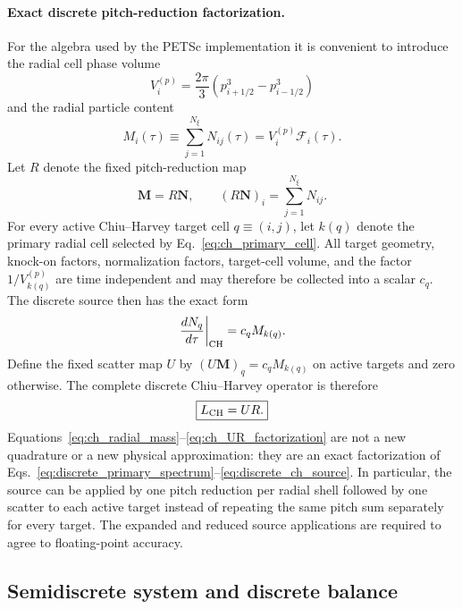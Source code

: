 \documentclass[11pt]{article}
\begin{document}
\paragraph{Exact discrete pitch-reduction factorization.}
For the algebra used by the PETSc implementation it is convenient to introduce the radial
cell phase volume
\begin{equation}
 V_i^{(p)}=\frac{2\pi}{3}
 \left(p_{i+1/2}^3-p_{i-1/2}^3\right)
\end{equation}
and the radial particle content
\begin{equation}
 \boxed{
 M_i(\tau)\equiv\sum_{j=1}^{N_\xi}N_{ij}(\tau)
 =V_i^{(p)}\mathcal F_i(\tau).
 }
 \label{eq:ch_radial_mass}
\end{equation}
Let $R$ denote the fixed pitch-reduction map
\begin{equation}
 \bm M=R\bm N,
 \qquad
 (R\bm N)_i=\sum_{j=1}^{N_\xi}N_{ij}.
 \label{eq:ch_reduction_matrix}
\end{equation}
For every active Chiu--Harvey target cell $q\equiv(i,j)$, let $k(q)$ denote the
primary radial cell selected by Eq.~\eqref{eq:ch_primary_cell}.  All target geometry,
knock-on factors, normalization factors, target-cell volume, and the factor
$1/V_{k(q)}^{(p)}$ are time independent and may therefore be collected into a scalar
$c_q$.  The discrete source then has the exact form
\begin{equation}
 \left.\frac{dN_q}{d\tau}\right|_{\rm CH}
 =c_q M_{k(q)}.
 \label{eq:ch_mass_scatter}
\end{equation}
Define the fixed scatter map $U$ by $(U\bm M)_q=c_qM_{k(q)}$ on active targets and
zero otherwise.  The complete discrete Chiu--Harvey operator is therefore
\begin{equation}
 \boxed{L_{\rm CH}=UR.}
 \label{eq:ch_UR_factorization}
\end{equation}
Equations~\eqref{eq:ch_radial_mass}--\eqref{eq:ch_UR_factorization} are not a new
quadrature or a new physical approximation: they are an exact factorization of
Eqs.~\eqref{eq:discrete_primary_spectrum}--\eqref{eq:discrete_ch_source}.  In particular,
the source can be applied by one pitch reduction per radial shell followed by one scatter
to each active target instead of repeating the same pitch sum separately for every target.
The expanded and reduced source applications are required to agree to floating-point
accuracy.

\subsection{Semidiscrete system and discrete balance}
\end{document}
